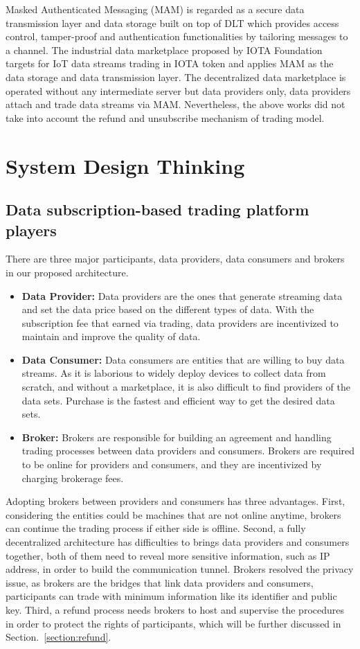 \documentclass[conference]{IEEEtran}
\begin{document}
Masked Authenticated Messaging (MAM)\cite{MAM} is regarded as a secure data transmission layer and data storage built on top of DLT which provides access control, tamper-proof and authentication functionalities by tailoring messages to a channel. The industrial data marketplace\cite{IOTAIdustryMarketplace} proposed by IOTA Foundation targets for IoT data streams trading in IOTA token and applies MAM as the data storage and data transmission layer. The decentralized data marketplace\cite{DDMSmartCities} is operated without any intermediate server but data providers only, data providers attach and trade data streams via MAM. Nevertheless, the above works did not take into account the refund and unsubscribe mechanism of trading model.
 
\section{System Design Thinking}
\label{section:design_thinking}
\subsection{Data subscription-based trading platform players}
There are three major participants, data providers, data consumers and brokers in our proposed architecture.

\begin{itemize}
\item \textbf{Data Provider: }
Data providers are the ones that generate streaming data and set the data price based on the different types of data. With the subscription fee that earned via trading, data providers are incentivized to maintain and improve the quality of data.
\item \textbf{Data Consumer: }
Data consumers are entities that are willing to buy data streams. As it is laborious to widely deploy devices to collect data from scratch, and without a marketplace, it is also difficult to find providers of the data sets. Purchase is the fastest and efficient way to get the desired data sets.
\item \textbf{Broker: }
Brokers are responsible for building an agreement and handling trading processes between data providers and consumers. Brokers are required to be online for providers and consumers, and they are incentivized by charging brokerage fees.
\end{itemize}

Adopting brokers between providers and consumers has three advantages. First, considering the entities could be machines that are not online anytime, brokers can continue the trading process if either side is offline. Second, a fully decentralized architecture has difficulties to brings data providers and consumers together, both of them need to reveal more sensitive information, such as IP address, in order to build the communication tunnel. Brokers resolved the privacy issue, as brokers are the bridges that link data providers and consumers, participants can trade with minimum information like its identifier and public key. Third, a refund process needs brokers to host and supervise the procedures in order to protect the rights of participants, which will be further discussed in Section.~\ref{section:refund}.
\end{document}

